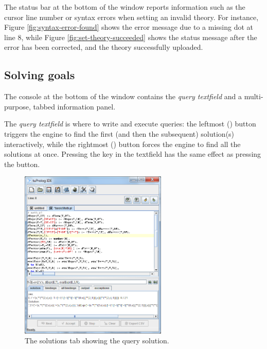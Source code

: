 The status bar at the bottom of the window reports information such as the cursor line number or syntax errors when setting an invalid theory.
%
For instance, Figure \ref{fig:syntax-error-found} shows the error message due to a missing dot at line 8, while Figure \ref{fig:set-theory-succeeded} shows the status message after the error has been corrected, and the theory successfully uploaded.

\subsection{Solving goals}
\label{sec:solving-goals}

The console at the bottom of the window contains the \textit{query textfield} and a multi-purpose, tabbed information panel.

The \textit{query textfield} is where to write and execute queries: the leftmost () button triggers the engine to find the first (and then the subsequent) solution(s) interactively, while the rightmost () button forces the engine to find all the solutions at once.
%
Pressing the  key in the textfield has the same effect as pressing the  button.

\begin{figure}
\centering
\includegraphics[width=7cm]{images/gui-solutions}
\caption{The solutions tab showing the query solution.}
\label{fig:gui-solutions}
\end{figure}

